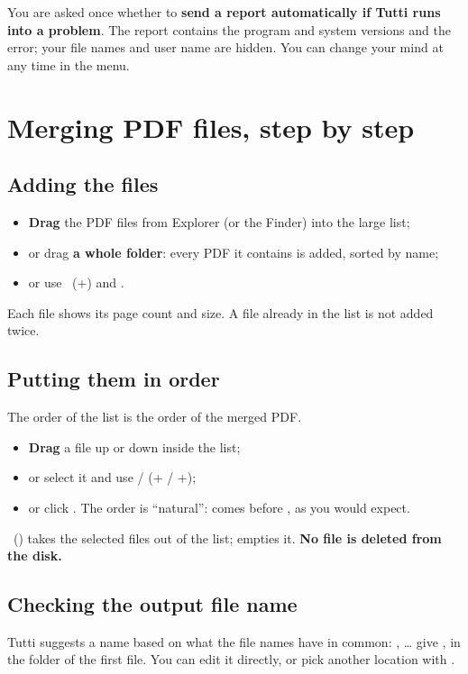 You are asked once whether to \textbf{send a report automatically if Tutti runs into a problem}.
The report contains the program and system versions and the error; your file names and user name
are hidden. You can change your mind at any time in the  menu.


\section{Merging PDF files, step by step}\label{sec:assembler}

\subsection{Adding the files}
\begin{itemize}
\item \textbf{Drag} the PDF files from Explorer (or the Finder) into the large list;
\item or drag \textbf{a whole folder}: every PDF it contains is added, sorted by name;
\item or use  \ (+) and .
\end{itemize}
Each file shows its page count and size. A file already in the list is not added twice.

\subsection{Putting them in order}
The order of the list is the order of the merged PDF.
\begin{itemize}
\item \textbf{Drag} a file up or down inside the list;
\item or select it and use  / 
      (+ / +);
\item or click . The order is “natural”:  comes before
      , as you would expect.
\end{itemize}
 \ () takes the selected files out of the list;  empties
it. \textbf{No file is deleted from the disk.}


\subsection{Checking the output file name}
Tutti suggests a name based on what the file names have in common:
, … give
, in the folder of the first file. You can edit it
directly, or pick another location with .

